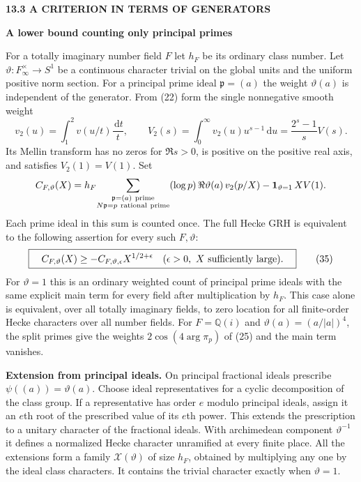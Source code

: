 \documentclass[11pt,letterpaper]{article}
\newcommand{\rightmarktext}{}
\newcommand{\printfolio}{}
\newcommand{\leaf}[4]{\clearpage\gdef\printfolio{#1}\gdef\rightmarktext{#2}%
  {\small\sffamily\bfseries\color{ink}#3\par}\vspace{3pt}%
  {\LARGE\bfseries #4\par}\vspace{5pt}}
\newcommand{\point}[1]{\par\smallskip\textbf{#1.}\enspace\ignorespaces}
\newcommand{\Q}{\mathbb Q}
\newcommand{\dd}{\,\mathrm d}
\begin{document}
\leaf{522l}{Principal prime ideals}{13.3 \quad A CRITERION IN TERMS OF GENERATORS}{A lower bound counting only principal primes}
For a totally imaginary number field $F$ let $h_F$ be its ordinary class
number. Let $\vartheta:F_\infty^\times\to S^1$ be a continuous character
trivial on the global units and the uniform positive norm section.
For a principal prime ideal $\mathfrak p=(a)$ the weight
$\vartheta(a)$ is independent of the generator. From (22) form the
single nonnegative smooth weight
\[
 v_2(u)=\int_1^2 v(u/t)\frac{\dd t}{t},\qquad
 V_2(s)=\int_0^\infty v_2(u)u^{s-1}\dd u
       =\frac{2^s-1}{s}V(s).
\]
Its Mellin transform has no zeros for $\Re s>0$, is positive on the
positive real axis, and satisfies $V_2(1)=V(1)$. Set
\[
 C_{F,\vartheta}(X)=
 h_F\!\sum_{\substack{\mathfrak p=(a)\ {\rm prime}\\
                       N\mathfrak p=p\ {\rm rational\ prime}}}
 (\log p)\,\Re\vartheta(a)\,v_2(p/X)
 -\mathbf1_{\vartheta=1}\,X V(1).
\]
Each prime ideal in this sum is counted once. The full Hecke GRH is
equivalent to the following assertion for every such $F,\vartheta$:
\[
 \boxed{\quad C_{F,\vartheta}(X)\ge
 -C_{F,\vartheta,\epsilon}X^{1/2+\epsilon}
 \quad (\epsilon>0,\ X\ \hbox{sufficiently large}).\quad}
 \tag{35}
\]
For $\vartheta=1$ this is an ordinary weighted count of principal
prime ideals with the same explicit main term for every field after
multiplication by $h_F$. This case alone is equivalent, over all
totally imaginary fields, to zero location for all finite-order
Hecke characters over all number fields. For $F=\Q(i)$ and
$\vartheta(a)=(a/|a|)^4$, the split primes give the weights
$2\cos(4\arg\pi_p)$ of (25) and the main term vanishes.

\point{Extension from principal ideals}
On principal fractional ideals prescribe $\psi((a))=\vartheta(a)$.
Choose ideal representatives for a cyclic decomposition of the class
group. If a representative has order $e$ modulo principal ideals,
assign it an $e$th root of the prescribed value of its $e$th power.
This extends the prescription to a unitary character of the fractional
ideals. With archimedean component $\vartheta^{-1}$ it defines a
normalized Hecke character unramified at every finite place. All the
extensions form a family $\mathcal X(\vartheta)$ of size $h_F$,
obtained by multiplying any one by the ideal class characters. It
contains the trivial character exactly when $\vartheta=1$.
\end{document}
